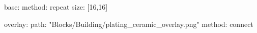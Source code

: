base:
  method: repeat
  size: [16,16]

overlay:
  path: "Blocks/Building/plating_ceramic_overlay.png"
  method: connect
